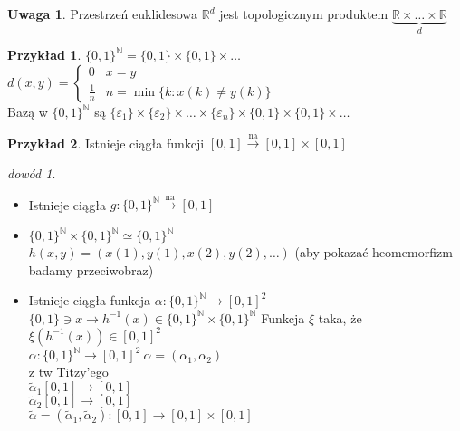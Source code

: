 \documentclass[twoside,10pt]{article}
\theoremstyle{definition}
\theoremstyle{definition}
\theoremstyle{definition}
\theoremstyle{definition}
\theoremstyle{remark}
\newtheorem*{dd}{dowód}
\theoremstyle{definition}
\newtheorem*{uw}{Uwaga}
\theoremstyle{definition}
\theoremstyle{definition}
\theoremstyle{definition}
\newtheorem*{prz}{Przykład}
\theoremstyle{definition}
\theoremstyle{definition}
\begin{document}
\begin{uw} 
    Przestrzeń euklidesowa $\mathbb R ^d$ jest topologicznym produktem $\underbrace{\mathbb R 
    \times \ldots \times \mathbb R}_{d}$
\end{uw} 
\begin{prz} 
    $\{0,1\}^\mathbb N = \{0,1\} \times \{0,1\} \times \ldots$ \\ 
    $d(x,y) = \begin{cases} 0 & x = y \\ \frac{1}{n} & n = \min \{k: x(k) \neq y(k)\} \end{cases}$ \\ 
    Bazą w $\{0,1\}^\mathbb N$ są $\{\varepsilon_1\} \times \{\varepsilon_2\} \times 
    \ldots \times \{\varepsilon_n\} \times \{0,1\} \times \{0,1\} \times \ldots$
\end{prz}      
\begin{prz} 
    Istnieje ciągła funkcji $[0,1] \xrightarrow{\text{na}} [0,1] \times [0,1]$
    \begin{dd}\hfill 
        \begin{itemize} 
            \item Istnieje ciągła $g: \{0,1\}^\mathbb N \xrightarrow{\text{na}} [0,1]$
            \item $\{0,1\} ^\mathbb N \times \{0,1\}^ \mathbb N \simeq \{0,1\}^\mathbb N$ \\ 
                $h(x,y) = (x(1),y(1),x(2),y(2),\ldots)$ (aby pokazać heomemorfizm badamy przeciwobraz)
            \item Istnieje ciągła funkcja $\alpha: \{0,1\}^\mathbb N \to [0,1]^2$ \\ 
                $\{0,1\} \ni x \to h^{-1} (x) \in \{0,1\}^\mathbb N \times \{0,1\}^\mathbb N$ 
                Funkcja $\xi$ taka, że $\xi(h^{-1} (x)) \in [0,1]^2$ \\ 
                $\alpha : \{0,1\}^\mathbb N \to [0,1]^2 \ \alpha = (\alpha_1,\alpha_2)$ \\ 
                z tw Titzy'ego \\ 
                $\widetilde \alpha_1 [0,1] \to [0,1]$ \\ 
                $\widetilde \alpha_2 [0,1] \to [0,1]$ \\ 
                $\widetilde \alpha = (\widetilde \alpha_1,\widetilde \alpha_2): 
                [0,1] \to [0,1] \times [0,1]$
        \end{itemize} 
    \end{dd}
\end{prz} 
\end{document}
